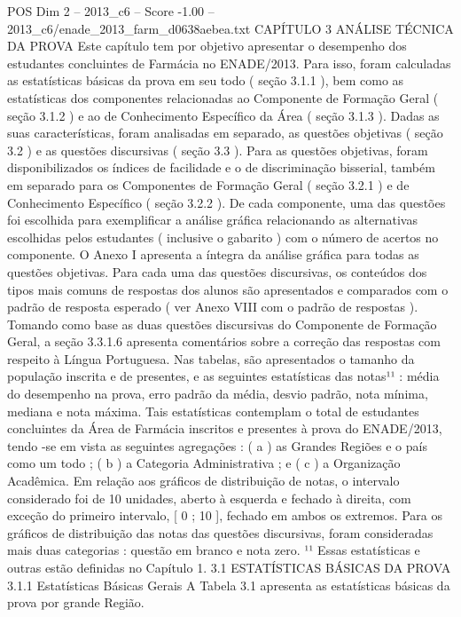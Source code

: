 \begin{textsample}{POS Dim 2 – 2013\_c6 – Score -1.00 – 2013\_c6/enade\_2013\_farm\_d0638aebea.txt}  \label{ex:f2_pos_377}
CAPÍTULO 3 ANÁLISE TÉCNICA DA PROVA Este capítulo tem por objetivo apresentar o desempenho dos estudantes concluintes de Farmácia no ENADE/2013.
Para isso, foram calculadas as estatísticas básicas da prova em seu todo ( seção 3.1.1 ), bem como as estatísticas dos componentes relacionadas ao Componente de Formação Geral ( seção 3.1.2 ) e ao de Conhecimento Específico da Área ( seção 3.1.3 ).
Dadas as suas características, foram analisadas em separado, as questões objetivas ( seção 3.2 ) e as questões discursivas ( seção 3.3 ).
Para as questões objetivas, foram disponibilizados os índices de facilidade e o de discriminação bisserial, também em separado para os Componentes de Formação Geral ( seção 3.2.1 ) e de Conhecimento Específico ( seção 3.2.2 ).
De cada componente, uma das questões foi escolhida para exemplificar a análise gráfica relacionando as alternativas escolhidas pelos estudantes ( inclusive o gabarito ) com o número de acertos no componente.
O Anexo I apresenta a íntegra da análise gráfica para todas as questões objetivas.
Para cada uma das questões discursivas, os conteúdos dos tipos mais comuns de respostas dos alunos são apresentados e comparados com o padrão de resposta esperado ( ver Anexo VIII com o padrão de respostas ).
Tomando como base as duas questões discursivas do Componente de Formação Geral, a seção 3.3.1.6 apresenta comentários sobre a correção das respostas com respeito à Língua Portuguesa.
Nas tabelas, são apresentados o tamanho da população inscrita e de presentes, e as seguintes estatísticas das notas¹¹ : média do desempenho na prova, erro padrão da média, desvio padrão, nota mínima, mediana e nota máxima.
Tais estatísticas contemplam o total de estudantes concluintes da Área de Farmácia inscritos e presentes à prova do ENADE/2013, tendo -se em vista as seguintes agregações : ( a ) as Grandes Regiões e o país como um todo ; ( b ) a Categoria Administrativa ; e ( c ) a Organização Acadêmica.
Em relação aos gráficos de distribuição de notas, o intervalo considerado foi de 10 unidades, aberto à esquerda e fechado à direita, com exceção do primeiro intervalo, [ 0 ; 10 ], fechado em ambos os extremos.
Para os gráficos de distribuição das notas das questões discursivas, foram consideradas mais duas categorias : questão em branco e nota zero. ¹¹ Essas estatísticas e outras estão definidas no Capítulo 1. 3.1 ESTATÍSTICAS BÁSICAS DA PROVA 3.1.1 Estatísticas Básicas Gerais A Tabela 3.1 apresenta as estatísticas básicas da prova por grande Região.

\end{textsample}
